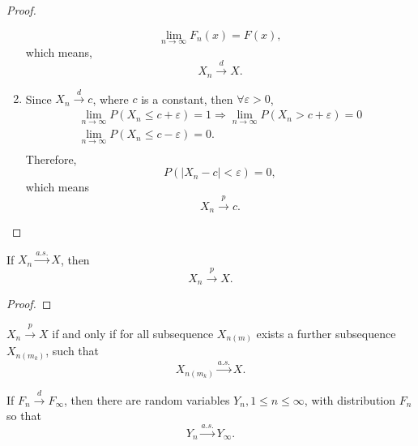 \begin{proof}
\begin{enumerate}
		      \begin{equation*}
			      \lim_{n\rightarrow\infty}F_n(x)=F(x),
		      \end{equation*}
		      which means,
		      \begin{equation*}
			      X_n\stackrel{d}{\rightarrow}X.
		      \end{equation*}
		\item
		      Since \(X_{n}\stackrel{d}{\rightarrow}c\), where \(c\) is a constant, then \(\forall\varepsilon>0\),
		      \begin{equation*}
			      \begin{gathered}
				      \lim_{n\rightarrow\infty}P(X_n\leq c+\varepsilon)=1\Rightarrow\lim_{n\rightarrow\infty}P(X_n>c+\varepsilon)=0\\
				      \lim_{n\rightarrow\infty}P(X_n\leq c-\varepsilon)=0.\\
			      \end{gathered}
		      \end{equation*}
		      Therefore,
		      \begin{equation*}
			      P\left(\left|X_n-c\right|<\varepsilon\right)=0,
		      \end{equation*}
		      which means
		      \begin{equation*}
			      X_n\stackrel{p}{\rightarrow}c.
		      \end{equation*}
	\end{enumerate}
\end{proof}

\begin{theorem}
	If \(X_{n}\stackrel{a.s.}{\rightarrow}X\), then
	\begin{equation}
		X_{n}\stackrel{p}{\rightarrow}X.
	\end{equation}
\end{theorem}

\begin{proof}

\end{proof}

\begin{theorem}
	\(X_n\stackrel{p}{\rightarrow}X\) if and only if for all subsequence \(X_{n(m)}\) exists a further subsequence \(X_{n(m_k)}\), such that
	\begin{equation}
		X_{n(m_k)}\stackrel{a.s.}{\rightarrow}X.
	\end{equation}
\end{theorem}

\begin{lemma}\label{lem:distribution-to-probability}
	If \(F_n\stackrel{d}{\rightarrow}F_\infty\), then there are random variables \(Y_n,1\leq n\leq \infty\), with distribution \(F_n\) so that
	\begin{equation}
		Y_n\stackrel{a.s.}{\rightarrow}Y_\infty.
	\end{equation}
\end{lemma}

